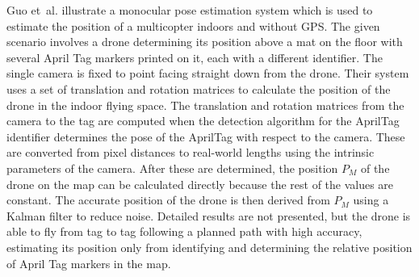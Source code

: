 Guo et~al.\@ \cite{monocular_pose_estimation} illustrate a monocular pose estimation system which is used to estimate the position of a multicopter indoors and without GPS. The given scenario involves a drone determining its position above a mat on the floor with several April Tag markers printed on it, each with a different identifier. The single camera is fixed to point facing straight down from the drone. Their system uses a set of translation and rotation matrices to calculate the position of the drone in the indoor flying space. The translation and rotation matrices from the camera to the tag are computed when the detection algorithm for the AprilTag identifier determines the pose of the AprilTag with respect to the camera. These are converted from pixel distances to real-world lengths using the intrinsic parameters of the camera. After these are determined, the position $P_M$ of the drone on the map can be calculated directly because the rest of the values are constant. The accurate position of the drone is then derived from $P_M$ using a Kalman filter to reduce noise. Detailed results are not presented, but the drone is able to fly from tag to tag following a planned path with high accuracy, estimating its position only from identifying and determining the relative position of April Tag markers in the map.



